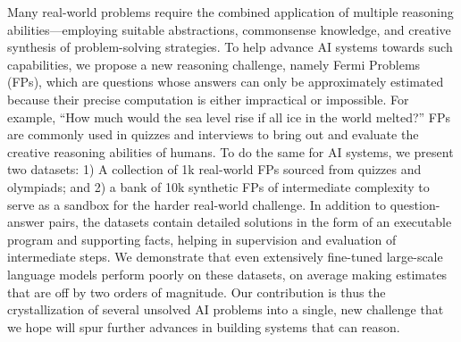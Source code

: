 Many real-world problems require the combined application of multiple reasoning abilities---employing suitable abstractions, commonsense knowledge, and creative synthesis of problem-solving strategies. To help advance AI systems towards such capabilities, we propose a new reasoning challenge, namely Fermi Problems (FPs), which are questions whose answers can only be approximately estimated because their precise computation is either impractical or impossible. For example, ``How much would the sea level rise if all ice in the world melted?'' FPs are commonly used in quizzes and interviews to bring out and evaluate the creative reasoning abilities of humans. To do the same for AI systems, we present two datasets: 1) A collection of 1k real-world FPs sourced from quizzes and olympiads; and 2) a bank of 10k synthetic FPs of intermediate complexity to serve as a sandbox for the harder real-world challenge. In addition to question-answer pairs, the datasets contain detailed solutions in the form of an executable program and supporting facts, helping in supervision and evaluation of intermediate steps. We demonstrate that even extensively fine-tuned large-scale language models perform poorly on these datasets, on average making estimates that are off by two orders of magnitude. Our contribution is thus the crystallization of several unsolved AI problems into a single, new challenge that we hope will spur further advances in building systems that can reason.
